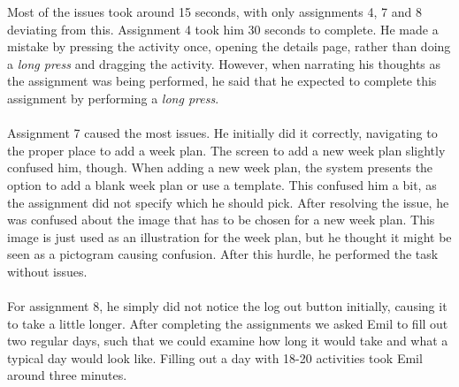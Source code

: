 Most of the issues took around 15 seconds, with only assignments 4, 7 and 8 deviating from this.
Assignment 4 took him 30 seconds to complete.
He made a mistake by pressing the activity once, opening the details page, rather than doing a \textit{long press} and dragging the activity.
However, when narrating his thoughts as the assignment was being performed, he said that he expected to complete this assignment by performing a \textit{long press}.
\\\\
Assignment 7 caused the most issues. 
He initially did it correctly, navigating to the proper place to add a week plan. 
The screen to add a new week plan slightly confused him, though.
When adding a new week plan, the system presents the option to add a blank week plan or use a template.
This confused him a bit, as the assignment did not specify which he should pick.
After resolving the issue, he was confused about the image that has to be chosen for a new week plan.
This image is just used as an illustration for the week plan, but he thought it might be seen as a pictogram causing confusion.
After this hurdle, he performed the task without issues.
\\\\
For assignment 8, he simply did not notice the log out button initially, causing it to take a little longer.
After completing the assignments we asked Emil to fill out two regular days, such that we could examine how long it would take and what a typical day would look like. 
Filling out a day with 18-20 activities took Emil around three minutes.

